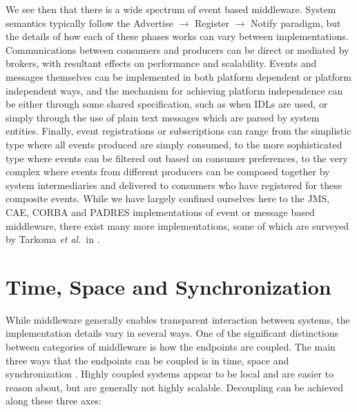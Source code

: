 \documentclass{acm_proc_article-sp}
\def\etal{{\it et al.\/}}
\begin{document}
We see then that there is a wide spectrum of event based middleware. System semantics typically follow the Advertise $\rightarrow$ Register $\rightarrow$ Notify paradigm, but the details of how each of these phases works can vary between implementations. Communications between consumers and producers can be direct or mediated by brokers, with resultant effects on performance and scalability. Events and messages themselves can be implemented in both platform dependent or platform independent ways, and the mechanism for achieving platform independence can be either through some shared specification, such as when IDLs are used, or simply through the use of plain text messages which are parsed by system entities. Finally, event registrations or subscriptions can range from the simplistic type where all events produced are simply consumed, to the more sophisticated type where events can be filtered out based on consumer preferences, to the very complex where events from different producers can be composed together by system intermediaries and delivered to consumers who have registered for these composite events. While we have largely confined ourselves here to the JMS, CAE, CORBA and PADRES implementations of event or message based middleware, there exist many more implementations, some of which are surveyed by Tarkoma \etal\ in \cite{Tarkoma:2006p6862}.




\section{Time, Space and Synchronization}
\label{sec:timespace}

While middleware generally enables transparent interaction between systems, the implementation details vary in several ways. One of the significant distinctions between categories of middleware is how the endpoints are coupled. The main three ways that the endpoints can be coupled is in time, space and synchronization \cite{Eugster:2003p6725}. Highly coupled systems appear to be local and are easier to reason about, but are generally not highly scalable. Decoupling can be achieved along these three axes:
\end{document}
